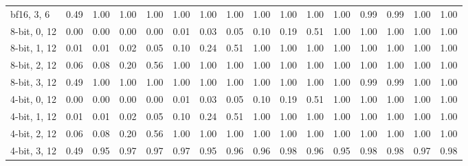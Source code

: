 \documentclass{article}
\theoremstyle{definition}
\theoremstyle{remark}
\begin{document}
\begin{table}[h]
\begin{tabular}{lrrrrrrrrrrrrrrr}
bf16, 3, 6 & 0.49 & 1.00 & 1.00 & 1.00 & 1.00 & 1.00 & 1.00 & 1.00 & 1.00 & 1.00 & 1.00 & 0.99 & 0.99 & 1.00 & 1.00 \\
8-bit, 0, 12 & 0.00 & 0.00 & 0.00 & 0.00 & 0.01 & 0.03 & 0.05 & 0.10 & 0.19 & 0.51 & 1.00 & 1.00 & 1.00 & 1.00 & 1.00 \\
8-bit, 1, 12 & 0.01 & 0.01 & 0.02 & 0.05 & 0.10 & 0.24 & 0.51 & 1.00 & 1.00 & 1.00 & 1.00 & 1.00 & 1.00 & 1.00 & 1.00 \\
8-bit, 2, 12 & 0.06 & 0.08 & 0.20 & 0.56 & 1.00 & 1.00 & 1.00 & 1.00 & 1.00 & 1.00 & 1.00 & 1.00 & 1.00 & 1.00 & 1.00 \\
8-bit, 3, 12 & 0.49 & 1.00 & 1.00 & 1.00 & 1.00 & 1.00 & 1.00 & 1.00 & 1.00 & 1.00 & 1.00 & 0.99 & 0.99 & 1.00 & 1.00 \\
4-bit, 0, 12 & 0.00 & 0.00 & 0.00 & 0.00 & 0.01 & 0.03 & 0.05 & 0.10 & 0.19 & 0.51 & 1.00 & 1.00 & 1.00 & 1.00 & 1.00 \\
4-bit, 1, 12 & 0.01 & 0.01 & 0.02 & 0.05 & 0.10 & 0.24 & 0.51 & 1.00 & 1.00 & 1.00 & 1.00 & 1.00 & 1.00 & 1.00 & 1.00 \\
4-bit, 2, 12 & 0.06 & 0.08 & 0.20 & 0.56 & 1.00 & 1.00 & 1.00 & 1.00 & 1.00 & 1.00 & 1.00 & 1.00 & 1.00 & 1.00 & 1.00 \\
4-bit, 3, 12 & 0.49 & 0.95 & 0.97 & 0.97 & 0.97 & 0.95 & 0.96 & 0.96 & 0.98 & 0.96 & 0.95 & 0.98 & 0.98 & 0.97 & 0.98 \\
\bottomrule
\end{tabular}
\end{table}
\end{document}
